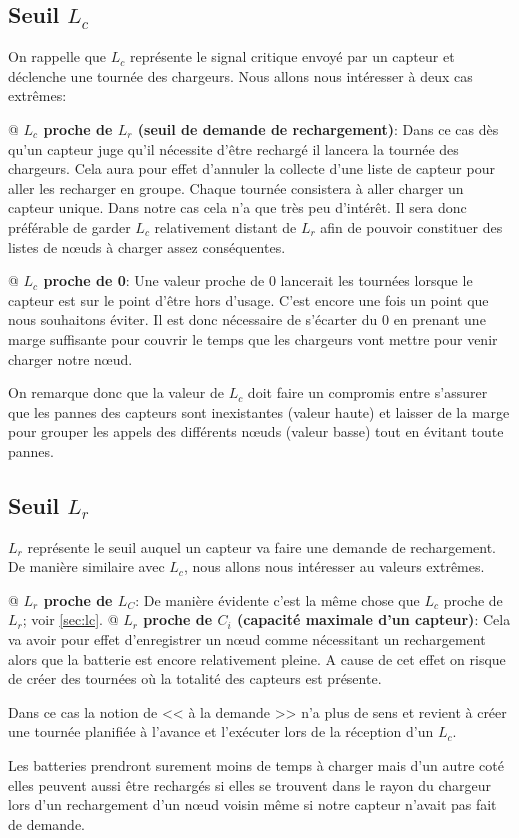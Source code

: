 \documentclass[final]{polytech/polytech}
\begin{document}
		\subsection{Seuil $L_c$\label{sec:lc}}
			On rappelle que $L_c$ représente le signal critique envoyé par un capteur et déclenche une tournée des chargeurs.
			Nous allons nous intéresser à deux cas extrêmes:
			\begin{easylist}
				@ \textbf{$L_c$ proche de $L_r$ (seuil de demande de rechargement)}: Dans ce cas dès qu'un capteur juge qu'il nécessite d'être rechargé il lancera la tournée des chargeurs.
				Cela aura pour effet d'annuler la collecte d'une liste de capteur pour aller les recharger en groupe.
				Chaque tournée consistera à aller charger un capteur unique.
				Dans notre cas cela n'a que très peu d'intérêt.
				Il sera donc préférable de garder $L_c$ relativement distant de $L_r$ afin de pouvoir constituer des listes de n\oe uds à charger assez conséquentes.
				
				@ \textbf{$L_c$ proche de 0}: Une valeur proche de 0 lancerait les tournées lorsque le capteur est sur le point d'être hors d'usage.
				C'est encore une fois un point que nous souhaitons éviter.
				Il est donc nécessaire de s'écarter du 0 en prenant une marge suffisante pour couvrir le temps que les chargeurs vont mettre pour venir charger notre n\oe ud.
			\end{easylist}
			
			On remarque donc que la valeur de $L_c$ doit faire un compromis entre s'assurer que les pannes des capteurs sont inexistantes (valeur haute) et laisser de la marge pour grouper les appels des différents n\oe uds (valeur basse) tout en évitant toute pannes.
			
		\subsection{Seuil $L_r$}
			$L_r$ représente le seuil auquel un capteur va faire une demande de rechargement.
			De manière similaire avec $L_c$, nous allons nous intéresser au valeurs extrêmes.
			
			\begin{easylist}
				@ \textbf{$L_r$ proche de $L_C$}: De manière évidente c'est la même chose que $L_c$ proche de $L_r$; voir \autoref{sec:lc}.
				@ \textbf{$L_r$ proche de $C_i$ (capacité maximale d'un capteur)}: Cela va avoir pour effet d'enregistrer un n\oe ud comme nécessitant un rechargement alors que la batterie est encore relativement pleine.
				A cause de cet effet on risque de créer des tournées où la totalité des capteurs est présente.
				
				Dans ce cas la notion de << à la demande >> n'a plus de sens et revient à créer une tournée planifiée à l'avance et l'exécuter lors de la réception d'un $L_c$.
				
				Les batteries prendront surement moins de temps à charger mais d'un autre coté elles peuvent aussi être rechargés si elles se trouvent dans le rayon du chargeur lors d'un rechargement d'un n\oe ud voisin même si notre capteur n'avait pas fait de demande.
			\end{easylist}
			
\end{document}
